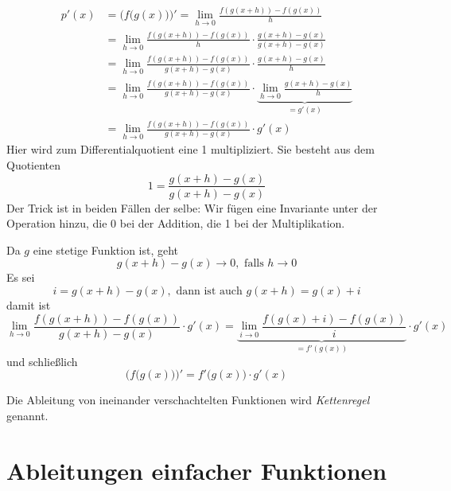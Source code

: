 \begin{equation}
\begin{split}
p'(x) &= \Big(f\big( g(x) \big)\Big)' = \lim_{h\rightarrow 0} \frac{f(g(x+h))-f(g(x))}{h}\\
&= \lim_{h\rightarrow 0} \frac{f(g(x+h))-f(g(x))}{h} \cdot \frac{g(x+h)-g(x)}{g(x+h)-g(x)} \\
&= \lim_{h\rightarrow 0} \frac{f(g(x+h))-f(g(x))}{g(x+h)-g(x)} \cdot \frac{g(x+h)-g(x)}{h} \\
&= \lim_{h\rightarrow 0} \frac{f(g(x+h))-f(g(x))}{g(x+h)-g(x)} \cdot \underbrace{\lim_{h\rightarrow 0} \frac{g(x+h)-g(x)}{h}}_{=g'(x)} \\
&= \lim_{h\rightarrow 0} \frac{f(g(x+h))-f(g(x))}{g(x+h)-g(x)} \cdot g'(x)
\end{split}
\end{equation}
Hier wird zum Differentialquotient eine 1 multipliziert. Sie besteht aus dem Quotienten
\begin{equation*}
1=\frac{g(x+h)-g(x)}{g(x+h)-g(x)}
\end{equation*}
Der Trick ist in beiden Fällen der selbe: Wir fügen eine Invariante unter der Operation hinzu, die 0 bei der Addition, die 1 bei der Multiplikation.

Da $g$ eine stetige Funktion ist, geht
\begin{equation*}
g(x+h)-g(x) \longrightarrow 0,\text{ falls } h\rightarrow 0
\end{equation*}
Es sei 
\begin{equation}
i = g(x+h)-g(x), \text{ dann ist auch } g(x+h) = g(x)+i
\end{equation}
damit ist
\begin{equation}
\lim_{h\rightarrow 0} \frac{f(g(x+h))-f(g(x))}{g(x+h)-g(x)} \cdot g'(x) = 
\underbrace{\lim_{i\rightarrow 0} \frac{f(g(x)+i)-f(g(x))}{i}}_{=f'(g(x))} \cdot g'(x)
\end{equation}
und schließlich
\begin{equation}
\Big(f\big( g(x) \big)\Big)' = f'\big( g(x)\big)\cdot g'(x)
\end{equation}
\begin{definition}
Die Ableitung von ineinander verschachtelten Funktionen wird \emph{Kettenregel} genannt.
\end{definition}

\section{Ableitungen einfacher Funktionen}

